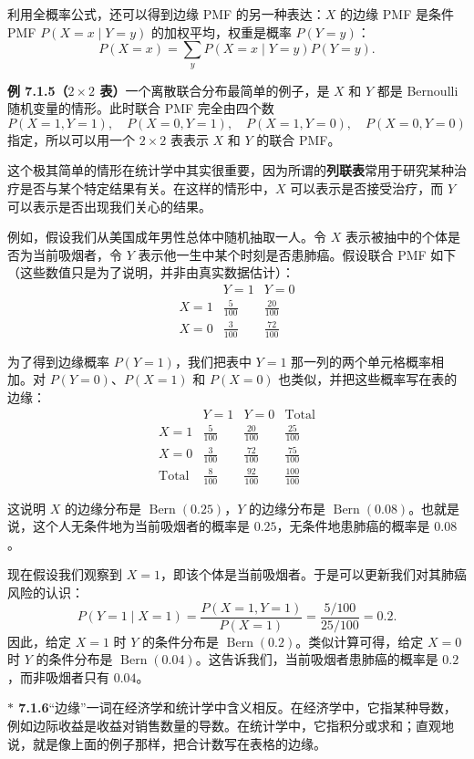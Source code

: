 \documentclass[UTF8, 12pt, fontset=fandol, oneside]{ctexart}
\newcommand{\biohazard}{\ensuremath{\ast}}
\begin{document}
利用全概率公式，还可以得到边缘 PMF 的另一种表达：$X$ 的边缘 PMF 是条件 PMF $P(X=x\mid Y=y)$ 的加权平均，权重是概率 $P(Y=y)$：
\[
  P(X=x)=\sum_y P(X=x\mid Y=y)P(Y=y).
\]

\noindent\textbf{例 7.1.5（$2\times 2$ 表）}\quad 一个离散联合分布最简单的例子，是 $X$ 和 $Y$ 都是 Bernoulli 随机变量的情形。此时联合 PMF 完全由四个数
\[
  P(X=1,Y=1),\quad P(X=0,Y=1),\quad P(X=1,Y=0),\quad P(X=0,Y=0)
\]
指定，所以可以用一个 $2\times 2$ 表表示 $X$ 和 $Y$ 的联合 PMF。

这个极其简单的情形在统计学中其实很重要，因为所谓的\textbf{列联表}常用于研究某种治疗是否与某个特定结果有关。在这样的情形中，$X$ 可以表示是否接受治疗，而 $Y$ 可以表示是否出现我们关心的结果。

例如，假设我们从美国成年男性总体中随机抽取一人。令 $X$ 表示被抽中的个体是否为当前吸烟者，令 $Y$ 表示他一生中某个时刻是否患肺癌。假设联合 PMF 如下（这些数值只是为了说明，并非由真实数据估计）：
\[
\begin{array}{c|cc}
 & Y=1 & Y=0\\ \hline
X=1 & \frac{5}{100} & \frac{20}{100}\\
X=0 & \frac{3}{100} & \frac{72}{100}
\end{array}
\]

为了得到边缘概率 $P(Y=1)$，我们把表中 $Y=1$ 那一列的两个单元格概率相加。对 $P(Y=0)$、$P(X=1)$ 和 $P(X=0)$ 也类似，并把这些概率写在表的边缘：
\[
\begin{array}{c|cc|c}
 & Y=1 & Y=0 & \text{Total}\\ \hline
X=1 & \frac{5}{100} & \frac{20}{100} & \frac{25}{100}\\
X=0 & \frac{3}{100} & \frac{72}{100} & \frac{75}{100}\\ \hline
\text{Total} & \frac{8}{100} & \frac{92}{100} & \frac{100}{100}
\end{array}
\]

这说明 $X$ 的边缘分布是 $\operatorname{Bern}(0.25)$，$Y$ 的边缘分布是 $\operatorname{Bern}(0.08)$。也就是说，这个人无条件地为当前吸烟者的概率是 $0.25$，无条件地患肺癌的概率是 $0.08$。

现在假设我们观察到 $X=1$，即该个体是当前吸烟者。于是可以更新我们对其肺癌风险的认识：
\[
  P(Y=1\mid X=1)
  =\frac{P(X=1,Y=1)}{P(X=1)}
  =\frac{5/100}{25/100}=0.2.
\]
因此，给定 $X=1$ 时 $Y$ 的条件分布是 $\operatorname{Bern}(0.2)$。类似计算可得，给定 $X=0$ 时 $Y$ 的条件分布是 $\operatorname{Bern}(0.04)$。这告诉我们，当前吸烟者患肺癌的概率是 $0.2$，而非吸烟者只有 $0.04$。

\noindent\textbf{$\biohazard$ 7.1.6}\quad “边缘”一词在经济学和统计学中含义相反。在经济学中，它指某种导数，例如边际收益是收益对销售数量的导数。在统计学中，它指积分或求和；直观地说，就是像上面的例子那样，把合计数写在表格的边缘。
\end{document}
